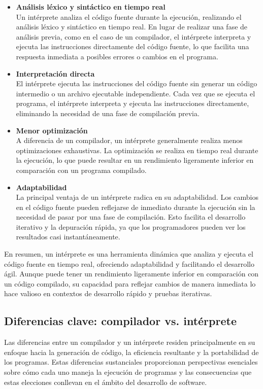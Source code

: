 \begin{itemize}
  \item \textbf{Análisis léxico y sintáctico en tiempo real} \\
  Un intérprete analiza el código fuente durante la ejecución, realizando el análisis léxico y sintáctico en tiempo real. En lugar de realizar una fase de análisis previa, como en el caso de un compilador, el intérprete interpreta y ejecuta las instrucciones directamente del código fuente, lo que facilita una respuesta inmediata a posibles errores o cambios en el programa. \parencite{Jeffery2021}
  \item \textbf{Interpretación directa} \\
  El intérprete ejecuta las instrucciones del código fuente sin generar un código intermedio o un archivo ejecutable independiente. Cada vez que se ejecuta el programa, el intérprete interpreta y ejecuta las instrucciones directamente, eliminando la necesidad de una fase de compilación previa. \parencite{Jeffery2021}
  \item \textbf{Menor optimización} \\
  A diferencia de un compilador, un intérprete generalmente realiza menos optimizaciones exhaustivas. La optimización se realiza en tiempo real durante la ejecución, lo que puede resultar en un rendimiento ligeramente inferior en comparación con un programa compilado. \parencite{Jeffery2021}
  \item \textbf{Adaptabilidad} \\
  La principal ventaja de un intérprete radica en su adaptabilidad. Los cambios en el código fuente pueden reflejarse de inmediato durante la ejecución sin la necesidad de pasar por una fase de compilación. Esto facilita el desarrollo iterativo y la depuración rápida, ya que los programadores pueden ver los resultados casi instantáneamente. \parencite{Jeffery2021}
\end{itemize}

En resumen, un intérprete es una herramienta dinámica que analiza y ejecuta el código fuente en tiempo real, ofreciendo adaptabilidad y facilitando el desarrollo ágil. Aunque puede tener un rendimiento ligeramente inferior en comparación con un código compilado, su capacidad para reflejar cambios de manera inmediata lo hace valioso en contextos de desarrollo rápido y pruebas iterativas.

\subsection{Diferencias clave: compilador vs. intérprete}
Las diferencias entre un compilador y un intérprete residen principalmente en su enfoque hacia la generación de código, la eficiencia resultante y la portabilidad de los programas. Estas diferencias sustanciales proporcionan perspectivas esenciales sobre cómo cada uno maneja la ejecución de programas y las consecuencias que estas elecciones conllevan en el ámbito del desarrollo de software.

